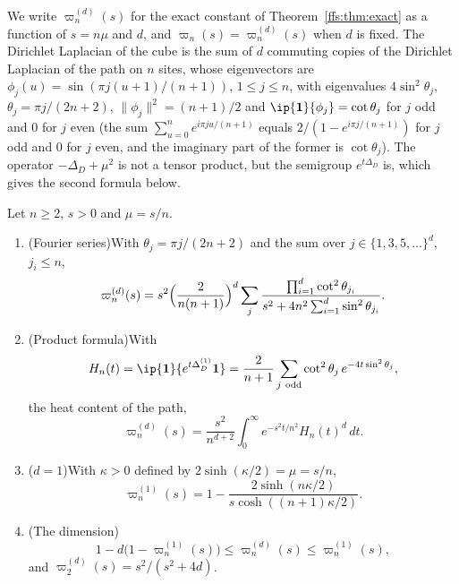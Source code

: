 We write $\varpi_n^{(d)}(s)$ for the exact constant of Theorem~\ref{ffs:thm:exact}
as a function of $s=n\mu$ and $d$, and $\varpi_n(s)=\varpi_n^{(d)}(s)$ when $d$
is fixed. The Dirichlet Laplacian of the cube is the sum of $d$ commuting
copies of the Dirichlet Laplacian of the path on $n$ sites, whose eigenvectors
are $\phi_j(u)=\sin(\pi j(u+1)/(n+1))$, $1\le j\le n$, with eigenvalues
$4\sin^2\theta_j$, $\theta_j=\pi j/(2n+2)$, $\lVert\phi_j\rVert^2=(n+1)/2$ and
$\ip{\mathbf 1}{\phi_j}=\cot\theta_j$ for $j$ odd and $0$ for $j$ even (the sum
$\sum_{u=0}^ne^{i\pi ju/(n+1)}$ equals $2/(1-e^{i\pi j/(n+1)})$ for $j$ odd and
$0$ for $j$ even, and the imaginary part of the former is $\cot\theta_j$).
The operator $-\Delta_D+\mu^2$ is not a tensor product, but the semigroup
$e^{t\Delta_D}$ is, which gives the second formula below.

\begin{corollary}\label{ffs:cor:closed}
Let $n\ge2$, $s>0$ and $\mu=s/n$.
\begin{enumerate}[label=\textup{(\roman*)},leftmargin=*]
\item \textup{(Fourier series)}\quad With $\theta_j=\pi j/(2n+2)$ and the sum
over $j\in\{1,3,5,\dots\}^d$, $j_i\le n$,
\[
\varpi_n^{(d)}(s)=s^2\Bigl(\frac2{n(n+1)}\Bigr)^d\sum_{j}\frac{\prod_{i=1}^d
\cot^2\theta_{j_i}}{s^2+4n^2\sum_{i=1}^d\sin^2\theta_{j_i}} .
\]
\item \textup{(Product formula)}\quad With
\[
H_n(t)=\ip{\mathbf 1}{e^{t\Delta_D^{(1)}}\mathbf 1}
=\frac2{n+1}\sum_{j\ \rm odd}\cot^2\theta_j\,e^{-4t\sin^2\theta_j},
\]
the heat content of the path,
\[
\varpi_n^{(d)}(s)=\frac{s^2}{n^{d+2}}\int_0^\infty e^{-s^2t/n^2}H_n(t)^d\,dt .
\]
\item \textup{($d=1$)}\quad With $\kappa>0$ defined by $2\sinh(\kappa/2)=\mu=
s/n$,
\[
\varpi_n^{(1)}(s)=1-\frac{2\sinh(n\kappa/2)}{s\cosh((n+1)\kappa/2)} .
\]
\item \textup{(The dimension)}\quad
\[
1-d\bigl(1-\varpi_n^{(1)}(s)\bigr)\le\varpi_n^{(d)}(s)\le\varpi_n^{(1)}(s),
\]
and $\varpi_2^{(d)}(s)=s^2/(s^2+4d)$.
\end{enumerate}
\end{corollary}

